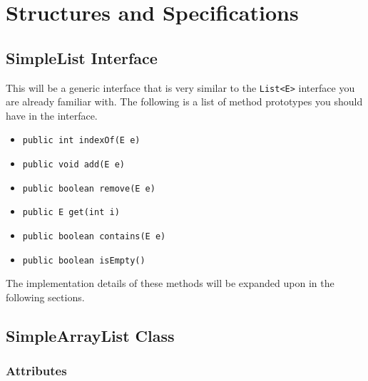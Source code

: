 \documentclass[a4paper]{article}
\begin{document}
\section*{Structures and Specifications}

\subsection*{SimpleList Interface}

This will be a generic interface that is very similar to the \lstinline|List<E>|
interface you are already familiar with. The following is a list of method 
prototypes you should have in the interface.

\begin{itemize}
    \item \lstinline|public int indexOf(E e)| 
    \item \lstinline|public void add(E e)| 
    \item \lstinline|public boolean remove(E e)| 
    \item \lstinline|public E get(int i)| 
    \item \lstinline|public boolean contains(E e)| 
    \item \lstinline|public boolean isEmpty()| 
\end{itemize}

The implementation details of these methods will be expanded upon in the
following sections.

\subsection*{SimpleArrayList Class}

\subsubsection*{Attributes}
\end{document}
